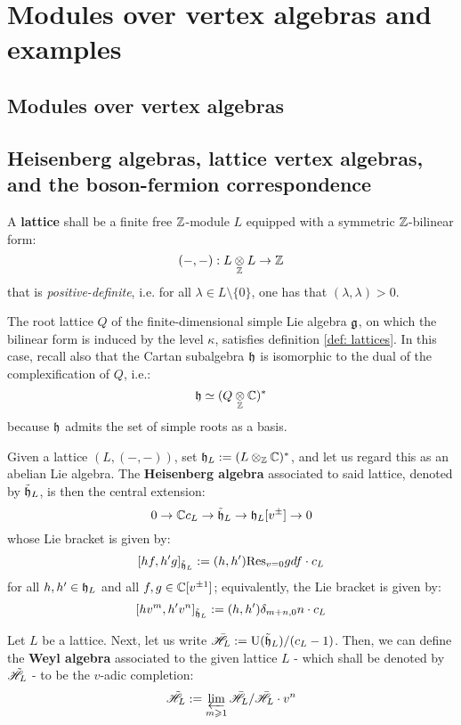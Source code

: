 \section{Modules over vertex algebras and examples}
    \subsection{Modules over vertex algebras}

    \subsection{Heisenberg algebras, lattice vertex algebras, and the boson-fermion correspondence}
        \begin{definition}[Lattices] \label{def: lattices}
            A \textbf{lattice} shall be a finite free $\mathbb{Z}$-module $L$ equipped with a symmetric $\mathbb{Z}$-bilinear form:
                $$(-, -): L \tensor_{\Z} L \to \Z$$
            that is \textit{positive-definite}, i.e. for all $\lambda \in L \setminus \{0\}$, one has that $(\lambda, \lambda) > 0$.
        \end{definition}
        \begin{example}
            The root lattice $Q$ of the finite-dimensional simple Lie algebra $\mathfrak{g}$, on which the bilinear form is induced by the level $\kappa$, satisfies definition \ref{def: lattices}. In this case, recall also that the Cartan subalgebra $\mathfrak{h}$ is isomorphic to the dual of the complexification of $Q$, i.e.:
                $$\h \cong (Q \tensor_{\Z} \bbC)^*$$
            because $\mathfrak{h}$ admits the set of simple roots as a basis.
        \end{example}

        \begin{definition} \label{def: lattice_heisenberg_algebras} 
            Given a lattice $(L, (-, -))$, set $\h_L := (L \tensor_{\Z} \bbC)^*$, and let us regard this as an abelian Lie algebra. The \textbf{Heisenberg algebra} associated to said lattice, denoted by $\tilde{\mathfrak{h}}_L$, is then the central extension:
                $$0 \to \mathbb{C} c_L \to \tilde{\mathfrak{h}}_L \to \mathfrak{h}_L[v^{\pm}] \to 0$$
            whose Lie bracket is given by:
                $$[ h f, h' g ]_{\tilde{\mathfrak{h}}_L} := (h, h') \mathrm{Res}_{v = 0} g df \cdot c_L$$
            for all $h, h' \in \mathfrak{h}_L$ and all $f, g \in \mathbb{C}[v^{\pm 1}]$; equivalently, the Lie bracket is given by:
                $$[h v^m, h' v^n]_{\tilde{\mathfrak{h}}_L} := (h, h') \delta_{m + n, 0} n \cdot c_L$$
        \end{definition}
        \begin{definition} \label{def: lattice_weyl_algebras}
            Let $L$ be a lattice. Next, let us write $\bar{\mathscr{H}}_L := \mathrm{U}(\tilde{\mathfrak{h}}_L)/(c_L - 1)$. Then, we can define the \textbf{Weyl algebra} associated to the given lattice $L$ - which shall be denoted by $\tilde{\mathscr{H}}_L$ - to be the $v$-adic completion:
                $$\tilde{\mathscr{H}}_L := \varprojlim_{m \geqslant 1} \bar{\mathscr{H}}_L/\bar{\mathscr{H}}_L \cdot v^n$$
        \end{definition}

